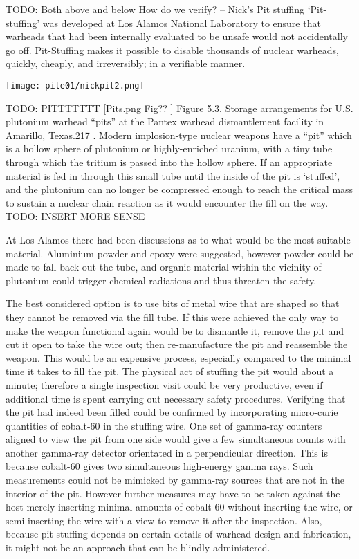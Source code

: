 \documentclass[twoside,titlepage,11pt,twocolumn,a4paper]{article}
\begin{document}
TODO: Both above and below
How do we verify? -- Nick’s Pit stuffing `Pit-stuffing' was developed
at Los Alamos National Laboratory to ensure that warheads that had
been internally evaluated to be unsafe would not accidentally go
off. Pit-Stuffing makes it possible to disable thousands of nuclear
warheads, quickly, cheaply, and irreversibly; in a verifiable manner.

\begin{figure*}
  \texttt{[image: pile01/nickpit2.png]}
\end{figure*}

TODO: PITTTTTTT
[Pits.png Fig?? ] Figure 5.3. Storage arrangements for U.S. plutonium
warhead ``pits'' at the Pantex warhead dismantlement facility in
Amarillo, Texas.217 \citep{IPFN2009}. Modern
implosion-type nuclear weapons have a ``pit'' which is a hollow sphere
of plutonium or highly-enriched uranium, with a tiny tube through
which the tritium is passed into the hollow sphere. If an appropriate
material is fed in through this small tube until the inside of the pit
is ‘stuffed’, and the plutonium can no longer be compressed enough to
reach the critical mass to sustain a nuclear chain reaction as it
would encounter the fill on the way.
TODO: INSERT MORE SENSE

At Los Alamos there had been discussions as to what would be the most
suitable material. Aluminium powder and epoxy were suggested, however
powder could be made to fall back out the tube, and organic material
within the vicinity of plutonium could trigger chemical radiations and
thus threaten the safety.

The best considered option is to use bits of metal wire that are
shaped so that they cannot be removed via the fill tube.  If this were
achieved the only way to make the weapon functional again would be to
dismantle it, remove the pit and cut it open to take the wire out;
then re-manufacture the pit and reassemble the weapon. This would be
an expensive process, especially compared to the minimal time it takes
to fill the pit.  The physical act of stuffing the pit would about a
minute; therefore a single inspection visit could be very productive,
even if additional time is spent carrying out necessary safety
procedures.  Verifying that the pit had indeed been filled could be
confirmed by incorporating micro-curie quantities of cobalt-60 in the
stuffing wire. One set of gamma-ray counters aligned to view the pit
from one side would give a few simultaneous counts with another
gamma-ray detector orientated in a perpendicular direction.  This is
because cobalt-60 gives two simultaneous high-energy gamma rays. Such
measurements could not be mimicked by gamma-ray sources that are not
in the interior of the pit. \citep{zarimpas2003} However further 
measures may have to be taken against the host
merely inserting minimal amounts of cobalt-60 without inserting the
wire, or semi-inserting the wire with a view to remove it after the
inspection. Also, because pit-stuffing depends on certain details of
warhead design and fabrication, it might not be an approach that can
be blindly administered.
\end{document}
